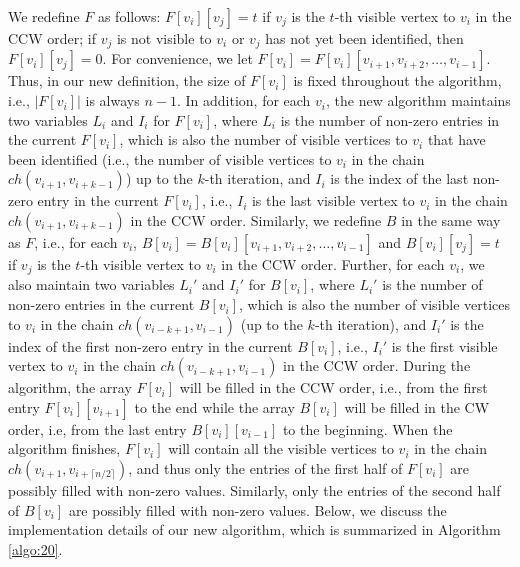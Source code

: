 \documentclass[11pt]{article}
\begin{document}
We redefine $F$ as follows: $F[v_i][v_j]=t$
if $v_j$ is the $t$-th visible vertex to $v_i$ in the CCW order; if
$v_j$ is not visible to $v_i$ or $v_j$ has not yet been identified, 
then $F[v_i][v_j]=0$. For convenience, we let
$F[v_i]=F[v_i][v_{i+1},v_{i+2},\ldots,v_{i-1}]$. 
Thus, in our new definition, the size of
$F[v_i]$ is fixed throughout the algorithm, i.e., $|F[v_i]|$ is always
$n-1$. In
addition, for each $v_i$, the new algorithm maintains two variables
$L_i$ and $I_i$ for $F[v_i]$, where $L_i$ is the number of non-zero
entries in the current $F[v_i]$, which is also the number of visible
vertices to $v_i$ that have been identified 
(i.e., the number of visible vertices to $v_i$ 
in the chain $ch(v_{i+1},v_{i+k-1})$) up to the $k$-th iteration, 
and $I_i$ is the index  
of the last non-zero entry in the current $F[v_i]$, i.e., $I_i$ is the
last visible vertex to $v_i$ in the chain $ch(v_{i+1},v_{i+k-1})$ in
the CCW order. 
Similarly, we redefine $B$ in the same way as $F$, i.e., for
each $v_i$, $B[v_i]=B[v_i][v_{i+1},v_{i+2},\ldots,v_{i-1}]$ and $B[v_i][v_j]=t$
if $v_j$ is the $t$-th visible vertex to $v_i$ in the CCW order.  
Further, for each $v_i$, we also maintain 
two variables $L_i'$ and $I_i'$ for $B[v_i]$, where $L_i'$ is the
number of non-zero entries in the current $B[v_i]$, which is also the
number of visible vertices to $v_i$ in the chain
$ch(v_{i-k+1},v_{i-1})$ (up to the $k$-th iteration), and $I_i'$ is the
index of the first non-zero entry in the current $B[v_i]$, i.e., $I_i'$ 
is the first visible vertex to $v_i$ in the chain
$ch(v_{i-k+1},v_{i-1})$ in the CCW order. During the
algorithm, the array $F[v_i]$ will be filled in the CCW order, i.e., 
from the first entry 
$F[v_i][v_{i+1}]$ to the end while the array $B[v_i]$ will be filled
in the CW order, i.e, from the last entry $B[v_i][v_{i-1}]$ to the
beginning. When the algorithm finishes, $F[v_i]$ will 
contain all the visible vertices to $v_i$ in the chain
$ch(v_{i+1},v_{i+\lceil n/2 \rceil})$, and thus only the entries of the first half
of $F[v_i]$ are possibly filled with non-zero values.
Similarly, only the entries of the second half of $B[v_i]$ are possibly
filled with non-zero values. Below, we discuss the implementation details of
our new algorithm, which is summarized in Algorithm \ref{algo:20}. 
\end{document}
